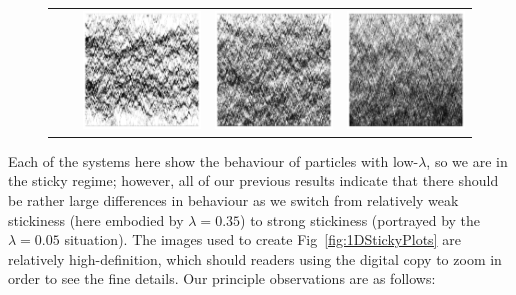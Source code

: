 \begin{figure}
\begin{center}
\begin{tabular}{c @{\hskip -0.5em} c| c @{\hskip -0.5em} c @{\hskip -0.5em} c}
\raisebox{5em}{1024} & & \includegraphics[width=0.31\linewidth]{numerics/images/stickyParticleFlows/flowImpL0p05T32p0.png} 
 & \includegraphics[width=0.31\linewidth]{numerics/images/stickyParticleFlows/flowImpL0p15T32p0.png}
 & \includegraphics[width=0.31\linewidth]{numerics/images/stickyParticleFlows/flowImpL0p35T32p0.png} \\ 
\end{tabular}
\end{center}
 \end{figure}
Each of the systems here show the behaviour of particles with low-$\lambda$, so we are in the sticky regime;
however, all of our previous results indicate that there should be rather large differences in behaviour
as we switch from relatively weak stickiness (here embodied by $\lambda=0.35$) to strong stickiness
(portrayed by the $\lambda = 0.05$ situation). The images used to create Fig~\ref{fig:1DStickyPlots} are
relatively high-definition, which should readers using the digital copy to zoom in order to see the fine 
details. Our principle observations are as follows:
